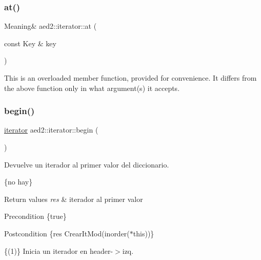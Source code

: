 \subsubsection{\texorpdfstring{at()}{at()}\hspace{0.1cm}{\footnotesize\ttfamily [2/2]}}
{\footnotesize\ttfamily Meaning\& aed2\+::iterator\+::at (\begin{DoxyParamCaption}\item[{const Key \&}]{key }\end{DoxyParamCaption})\hspace{0.3cm}{\ttfamily [inline]}}

This is an overloaded member function, provided for convenience. It differs from the above function only in what argument(s) it accepts. \mbox{\label{classaed2_1_1iterator_af8901de173468531c58458b581d345a6}} 
\subsubsection{\texorpdfstring{begin()}{begin()}\hspace{0.1cm}{\footnotesize\ttfamily [1/2]}}
{\footnotesize\ttfamily \hyperlink{classaed2_1_1iterator_1_1iterator}{iterator} aed2\+::iterator\+::begin (\begin{DoxyParamCaption}{ }\end{DoxyParamCaption})\hspace{0.3cm}{\ttfamily [inline]}}



Devuelve un iterador al primer valor del diccionario. 

\{no hay\}


\begin{DoxyRetVals}{Return values}
{\em res} & iterador al primer valor\\
\hline
\end{DoxyRetVals}
\begin{DoxyPrecond}{Precondition}
\{true\} 
\end{DoxyPrecond}
\begin{DoxyPostcond}{Postcondition}
\{res  Crear\+It\+Mod(inorder($\ast$this))\}
\end{DoxyPostcond}
\{(1)\} Inicia un iterador en header-\/$>$izq. \mbox{\label{classaed2_1_1iterator_a8a5783a3ab356cd6247b98d302d9130c}} 
